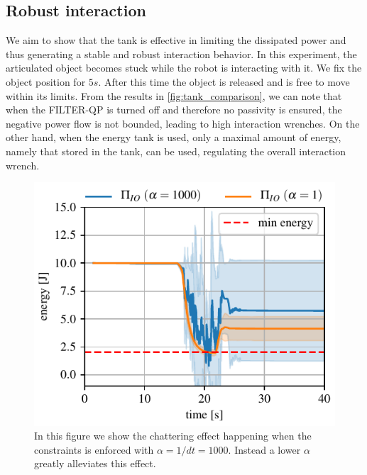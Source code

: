 \subsection{Robust interaction}
We aim to show that the tank is effective in limiting the dissipated power and thus generating a stable and robust interaction behavior. In this experiment, the articulated object becomes stuck while the robot is interacting with it. We fix the object position for $5s$. After this time the object is released and is free to move within its limits. From the results in \fig\ref{fig:tank_comparison}, we can note that when the FILTER-QP is turned off and therefore no passivity is ensured, the negative power flow is not bounded, leading to high interaction wrenches. On the other hand, when the energy tank is used, only a maximal amount of energy, namely that stored in the tank, can be used, regulating the overall interaction wrench.

\begin{figure}[t]
\centering
\includegraphics[width=0.8\columnwidth]{figures/fix_experiment/passivity_coefficient_comparison.pdf}
\caption{In this figure we show the chattering effect happening when the constraints is enforced with $\alpha = 1/dt = 1000$. Instead a lower $\alpha$ greatly alleviates this effect.  }\label{fig:tank_as_zbf}
\end{figure}




